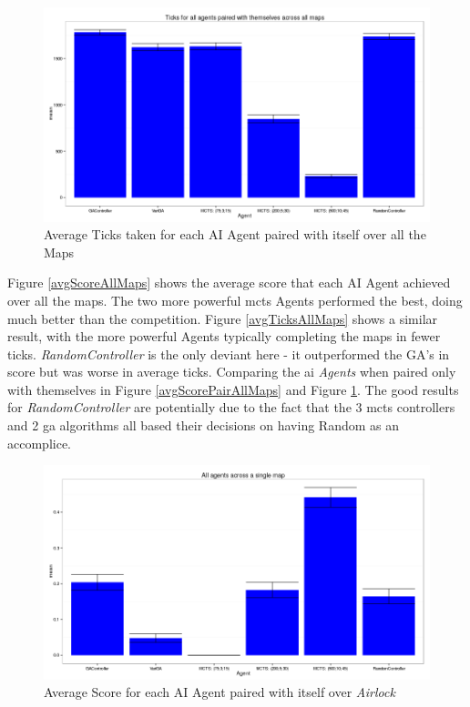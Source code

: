\documentclass{IEEEtran}
\begin{document}
\begin{figure}[!t]
\centering
\includegraphics[width=\linewidth]{ticks-samepairs}
\caption{Average Ticks taken for each AI Agent paired with itself over all the Maps}
\label{avgTicksPairAllMaps}
\end{figure}

Figure \ref{avgScoreAllMaps} shows the average score that each AI Agent achieved over all the maps. The two more powerful \gls{mcts} Agents performed the best, doing much better than the competition. Figure \ref{avgTicksAllMaps} shows a similar result, with the more powerful Agents typically completing the maps in fewer ticks. \emph{RandomController} is the only deviant here - it outperformed the GA's in score but was worse in average ticks. Comparing the \gls{ai} \emph{Agents} when paired only with themselves in Figure \ref{avgScorePairAllMaps} and Figure \ref{avgTicksPairAllMaps}. The good results for \emph{RandomController} are potentially due to the fact that the 3 \gls{mcts} controllers and 2 \gls{ga} algorithms all based their decisions on having Random as an accomplice.

\begin{figure}[!t]
\centering
\includegraphics[width = \linewidth]{level5-txt-scores}
\caption{Average Score for each AI Agent paired with itself over \emph{Airlock}}
\label{avgScoreMap5}
\end{figure}
\end{document}
